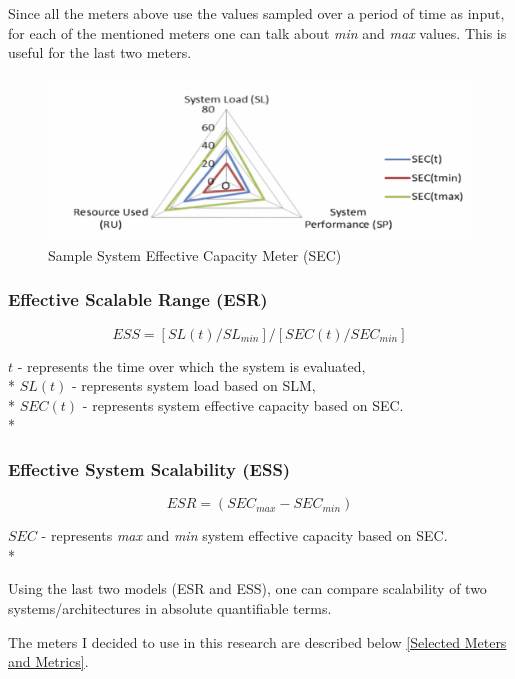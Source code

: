 \documentclass{uvamscse}
\begin{document}
Since all the meters above use the values sampled over a period of time as input, for each of the mentioned meters one can talk about \textit{min} and \textit{max} values. This is useful for the last two meters.

\begin{figure}[h]
\centering
\includegraphics[scale=0.3]{sec}
\caption{Sample System Effective Capacity Meter (SEC)}
\label{figure:sec}
\end{figure}

\subsubsection{Effective Scalable Range (ESR)}
\begin{center}
  $$ESS = [SL(t) / SL_{min}] / [SEC(t) / SEC_{min}]$$
\end{center}
  \texttt{$t$} - represents the time over which the system is evaluated, \\*
  \texttt{$SL(t)$} - represents system load based on SLM, \\*
  \texttt{$SEC(t)$} - represents system effective capacity based on SEC. \\*

\subsubsection{Effective System Scalability (ESS)}
\begin{center}
  $$ESR = (SEC_{max} - SEC_{min})$$
\end{center}
  \texttt{$SEC$} - represents \textit{max} and \textit{min} system effective capacity based on SEC. \\*

Using the last two models (ESR and ESS), one can compare scalability of two systems/architectures in absolute quantifiable terms.

The meters I decided to use in this research are described below \ref{Selected Meters and Metrics}.
\end{document}
